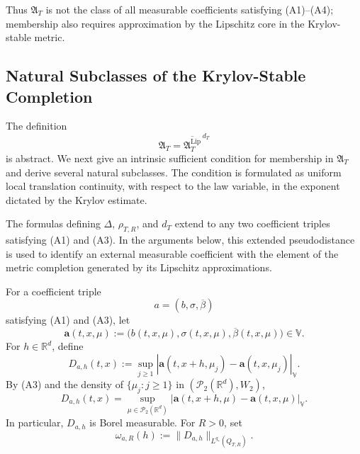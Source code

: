 \documentclass[12pt,oneside, reqno]{amsart}
\numberwithin{equation}{section}
\begin{document}
	Thus $\mathfrak A_T$ is not the class of all measurable coefficients
	satisfying \textnormal{(A1)}--\textnormal{(A4)}; membership also
	requires approximation by the Lipschitz core in the Krylov-stable
	metric.
	
	
	\subsection{Natural Subclasses of the Krylov-Stable Completion}
	\label{subsec:natural-subclasses-completion}
	
	The definition
	\[
	\mathfrak A_T
	=
	\overline{\mathfrak A_T^{\mathrm{Lip}}}^{\,d_T}
	\]
	is abstract. We next give an intrinsic sufficient condition for membership
	in \(\mathfrak A_T\) and derive several natural subclasses. The condition is
	formulated as uniform local translation continuity, with respect to the law
	variable, in the exponent dictated by the Krylov estimate. 
	
	The formulas defining \(\Delta\), \(\rho_{T,R}\), and \(d_T\) extend
	 to any two coefficient triples satisfying \textnormal{(A1)} and
	\textnormal{(A3)}. In the arguments below, this extended pseudodistance is
	used to identify an external measurable coefficient with the element of the
	metric completion generated by its Lipschitz approximations.
	
	For a coefficient triple
	\[
	a=(b,\sigma,\overline\beta)
	\]
	satisfying \textnormal{(A1)} and \textnormal{(A3)}, let
	\[
	\mathbf a(t,x,\mu)
	:=
	\bigl(
	b(t,x,\mu),
	\sigma(t,x,\mu),
	\overline\beta(t,x,\mu)
	\bigr)
	\in\mathbb V.
	\]
	For \(h\in\mathbb R^d\), define
	\begin{equation}
		\label{eq}
		D_{a,h}(t,x)
		:=
		\sup_{j\geq1}
		\left|
		\mathbf a(t,x+h,\mu_j)
		-
		\mathbf a(t,x,\mu_j)
		\right|_{\mathbb V}.
	\end{equation}
	By \textnormal{(A3)} and the density of
	\(\{\mu_j:j\geq1\}\) in \((\mathcal P_2(\mathbb R^d),W_2)\),
	\begin{equation}
		\label{eq:spatial-translation-error-full-supremum}
		D_{a,h}(t,x)
		=
		\sup_{\mu\in\mathcal P_2(\mathbb R^d)}
		\left|
		\mathbf a(t,x+h,\mu)
		-
		\mathbf a(t,x,\mu)
		\right|_{\mathbb V}.
	\end{equation}
	In particular, \(D_{a,h}\) is Borel measurable. For \(R>0\), set
	\begin{equation}
		\label{eq:spatial-translation-modulus}
		\omega_{a,R}(h)
		:=
		\|D_{a,h}\|_{L^{q_\ast}(Q_{T,R})}.
	\end{equation}
	
\end{document}
